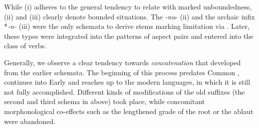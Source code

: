 \documentclass[output=paper]{langsci/langscibook}
\begin{document}
While (i) adheres to the general tendency to relate  with marked unboundedness, (ii) and (iii) clearly denote bounded situations. The  \textit{-nu}- (ii) and the archaic infix *\textit{-n-} (iii) were the only schemata to derive stems marking limitation via . Later, these types were integrated into the patterns of aspect pairs and entered into the class of  verbs.

Generally, we observe a clear tendency towards \textit{concatenation} that developed from the earlier schemata. The beginning of this process predates Common , continues into Early  and reaches up to the modern  languages, in which it is still not fully accomplished. Different kinds of modifications of the old suffixes (the second and third schema in  above) took place, while concomitant morphonological co-effects such as the lengthened grade of the root or the ablaut were abandoned.
\end{document}
